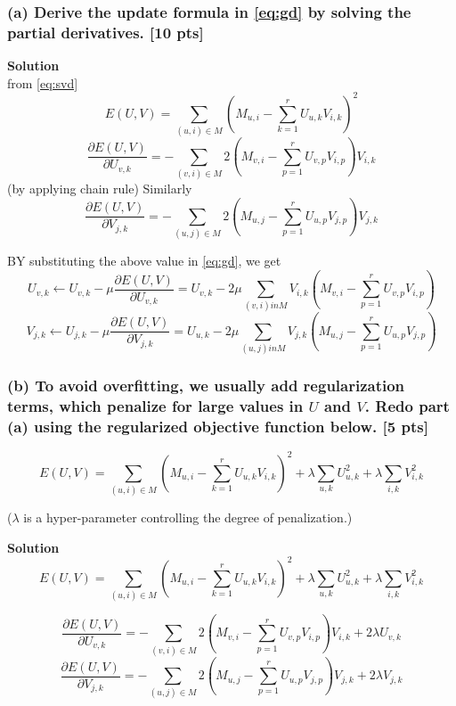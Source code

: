 \documentclass[twoside,10pt]{article}
\begin{document}
\subsubsection*{(a) Derive the update formula in \eqref{eq:gd} by
solving the partial derivatives. [10 pts]}

\textbf{Solution}\\
from \eqref{eq:svd}
$$E(U,V) =\sum_{(u, i)
\in M} (M_{u,i} - \sum_{k=1}^r U_{u,k} V_{i,k})^2 $$
$$\frac{\partial E(U, V)}{\partial U_{v,k}} = - \sum_{(v, i)
\in M} 2 (M_{v,i} - \sum_{p=1}^r U_{v,p} V_{i,p}) V_{i,k} $$
(by applying chain rule)
Similarly 
$$\frac{\partial E(U, V)}{\partial V_{j,k}} = - \sum_{(u, j)
\in M} 2 (M_{u,j} - \sum_{p=1}^r U_{u,p} V_{j,p}) V_{j,k} $$

BY substituting the above value in \eqref{eq:gd}, we get
$$U_{v,k} \gets U_{v,k} - \mu \frac{\partial E(U, V)}{\partial
U_{v,k}} = U_{v,k} - 2\mu \sum_{(v,i) in M} {V_{i,k} (M_{v,i} - \sum_{p=1}^r U_{v,p} V_{i,p})} $$
$$V_{j,k} \gets U_{j,k} - \mu \frac{\partial E(U, V)}{\partial
V_{j,k}} = U_{u,k} - 2\mu \sum_{(u,j) in M} {V_{j,k} (M_{u,j} - \sum_{p=1}^r U_{u,p} V_{j,p})} $$
\subsubsection*{(b) To avoid overfitting, we usually add regularization terms, which penalize for large values in $U$ and $V$.
Redo part (a) using the regularized objective function below. [5
pts]}

\begin{equation}
E(U,V) = \sum_{(u, i) \in M} (M_{u,i} - \sum_{k=1}^r U_{u,k}
V_{i,k})^2 + \lambda \sum_{u,k} U_{u,k}^2 + \lambda \sum_{i,k}
V_{i,k}^2 \nonumber
\end{equation}

($\lambda$ is a hyper-parameter controlling the degree of
penalization.)

\textbf{Solution}\\

$$E(U,V) = \sum_{(u, i) \in M} (M_{u,i} - \sum_{k=1}^r U_{u,k}
V_{i,k})^2 + \lambda \sum_{u,k} U_{u,k}^2 + \lambda \sum_{i,k}
V_{i,k}^2 \nonumber $$

$$\frac{\partial E(U, V)}{\partial U_{v,k}} = - \sum_{(v, i)
\in M} 2 (M_{v,i} - \sum_{p=1}^r U_{v,p} V_{i,p}) V_{i,k} + 2 \lambda U_{v,k} $$
$$\frac{\partial E(U, V)}{\partial V_{j,k}} = - \sum_{(u, j)
\in M} 2 (M_{u,j} - \sum_{p=1}^r U_{u,p} V_{j,p}) V_{j,k} + 2 \lambda V_{j,k}$$
\end{document}
